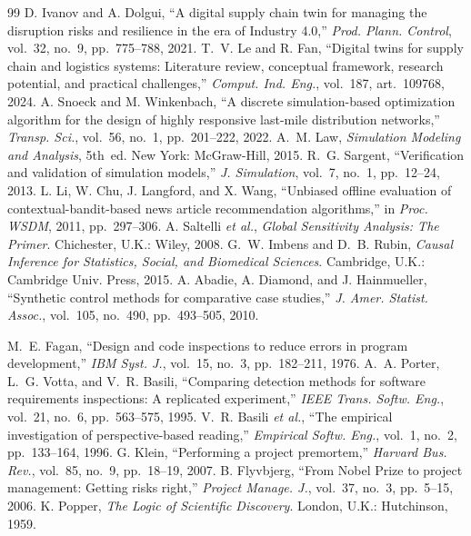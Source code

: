 \documentclass[10pt,twocolumn,letterpaper]{article}
\theoremstyle{definition}
\begin{document}
\begin{thebibliography}{99}
 D. Ivanov and A. Dolgui, ``A digital supply chain twin for managing the disruption risks and resilience in the era of Industry 4.0,'' \emph{Prod. Plann. Control}, vol.~32, no.~9, pp.~775--788, 2021.
 T.~V. Le and R. Fan, ``Digital twins for supply chain and logistics systems: Literature review, conceptual framework, research potential, and practical challenges,'' \emph{Comput. Ind. Eng.}, vol.~187, art.~109768, 2024.
 A. Snoeck and M. Winkenbach, ``A discrete simulation-based optimization algorithm for the design of highly responsive last-mile distribution networks,'' \emph{Transp. Sci.}, vol.~56, no.~1, pp.~201--222, 2022.
 A.~M. Law, \emph{Simulation Modeling and Analysis}, 5th~ed. New York: McGraw-Hill, 2015.
 R.~G. Sargent, ``Verification and validation of simulation models,'' \emph{J. Simulation}, vol.~7, no.~1, pp.~12--24, 2013.
 L. Li, W. Chu, J. Langford, and X. Wang, ``Unbiased offline evaluation of contextual-bandit-based news article recommendation algorithms,'' in \emph{Proc. WSDM}, 2011, pp.~297--306.
 A. Saltelli \emph{et al.}, \emph{Global Sensitivity Analysis: The Primer}. Chichester, U.K.: Wiley, 2008.
 G.~W. Imbens and D.~B. Rubin, \emph{Causal Inference for Statistics, Social, and Biomedical Sciences}. Cambridge, U.K.: Cambridge Univ. Press, 2015.
 A. Abadie, A. Diamond, and J. Hainmueller, ``Synthetic control methods for comparative case studies,'' \emph{J. Amer. Statist. Assoc.}, vol.~105, no.~490, pp.~493--505, 2010.

 M.~E. Fagan, ``Design and code inspections to reduce errors in program development,'' \emph{IBM Syst. J.}, vol.~15, no.~3, pp.~182--211, 1976.
 A.~A. Porter, L.~G. Votta, and V.~R. Basili, ``Comparing detection methods for software requirements inspections: A replicated experiment,'' \emph{IEEE Trans. Softw. Eng.}, vol.~21, no.~6, pp.~563--575, 1995.
 V.~R. Basili \emph{et al.}, ``The empirical investigation of perspective-based reading,'' \emph{Empirical Softw. Eng.}, vol.~1, no.~2, pp.~133--164, 1996.
 G. Klein, ``Performing a project premortem,'' \emph{Harvard Bus. Rev.}, vol.~85, no.~9, pp.~18--19, 2007.
 B. Flyvbjerg, ``From Nobel Prize to project management: Getting risks right,'' \emph{Project Manage. J.}, vol.~37, no.~3, pp.~5--15, 2006.
 K. Popper, \emph{The Logic of Scientific Discovery}. London, U.K.: Hutchinson, 1959.

\end{thebibliography}
\end{document}
